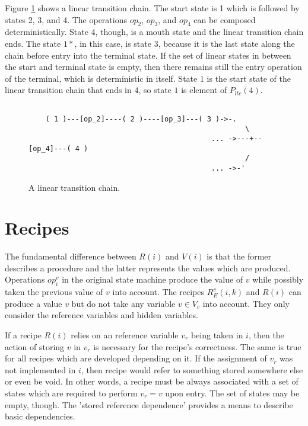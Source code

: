 \documentclass[12pt,a4paper]{scrartcl}
\begin{document}
Figure \ref{fig:linear-transition-chain} shows a linear transition chain. The
start state is 1 which is followed by states 2, 3, and 4. The operations
$op_2$, $op_3$, and $op_4$ can be composed deterministically. State 4,
though, is a mouth state and the linear transition chain ends. The state $1*$,
in this case, is state $3$, because it is the last state along the chain before
entry into the terminal state. If the set of linear states in between the start
and terminal state is empty, then there remains still the entry operation of
the terminal, which is deterministic in itself. State $1$ is the start state of
the linear transition chain that ends in $4$, so state $1$ is element of
$P_{ltc}(4)$.

\begin{figure}[htbp] \leavevmode \label{fig:linear-transition-chain}
\begin{verbatim}

    ( 1 )---[op_2]----( 2 )----[op_3]---( 3 )->-.
                                                   \
                                           ... ->---+--[op_4]---( 4 )
                                                   /
                                           ... ->-'
\end{verbatim}
\caption{A linear transition chain.}
\end{figure}
                                       
%
\section{Recipes}


The fundamental difference between $R(i)$ and $V(i)$ is that the former
describes a procedure and the latter represents the values which are produced.
Operations $op^v_i$ in the original state machine produce the value of $v$ 
while possibly taken the previous value of $v$ into account. The recipes
$R^v_E(i,k)$ and $R(i)$ can produce a value $v$ but do not take any 
variable $v\in V_c$ into account. They only consider the reference variables
and hidden variables. 

If a recipe $R(i)$ relies on an reference variable $v_r$ being taken in $i$, then
the action of storing $v$ in $v_r$ is necessary for the recipe's correctness.
The same is true for all recipes which are developed depending on it.  If the
assignment of $v_r$ was not implemented in $i$, then recipe would refer to
something stored somewhere else or even be void. In other words, a recipe must
be always associated with a set of states which are required to perform $v_r=v$
upon entry. The set of states may be empty, though. The 'stored reference
dependence' provides a means to describe basic dependencies.
\end{document}
